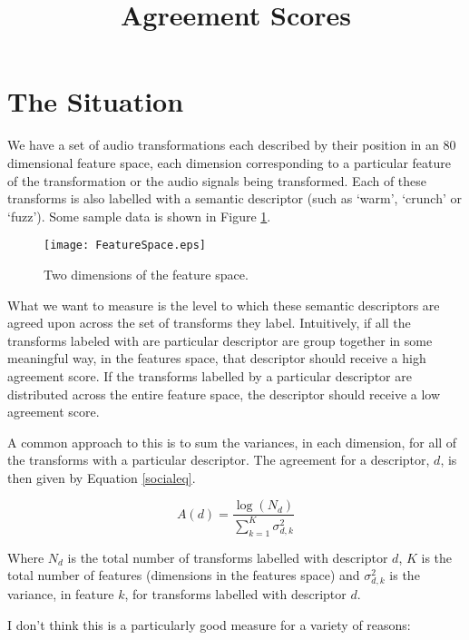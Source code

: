 \documentclass[a4paper]{article}
\title{Agreement Scores}
\author{}
\date{}
\begin{document}
\maketitle

\section*{The Situation}
We have a set of audio transformations each described by their position in an 80 dimensional feature space, each dimension
corresponding to a particular feature of the transformation or the audio signals being transformed. Each of these transforms
is also labelled with a semantic descriptor (such as `warm', `crunch' or `fuzz'). Some sample data is shown in Figure
\ref{FeatureSpace}.

	\begin{figure}
		\centering
		\texttt{[image: FeatureSpace.eps]}
		\caption{Two dimensions of the feature space.}
		\label{FeatureSpace}
	\end{figure}

What we want to measure is the level to which these semantic descriptors are agreed upon across the set of transforms they
label. Intuitively, if all the transforms labeled with are particular descriptor are group together in some meaningful way,
in the features space, that descriptor should receive a high agreement score. If the transforms labelled by a particular
descriptor are distributed across the entire feature space, the descriptor should receive a low agreement score.

A common approach to this is to sum the variances, in each dimension, for all of the transforms with a particular
descriptor.  The agreement for a descriptor, $d$, is then given by Equation \ref{socialeq}.

	\begin{equation}
		A(d) = \frac{\log(N_{d})}{\sum_{k=1}^{K} \sigma_{d,k}^{2}}
		\label{socialeq}
	\end{equation}

Where $N_{d}$ is the total number of transforms labelled with descriptor $d$, $K$ is the total number of features
(dimensions in the features space) and $\sigma_{d,k}^{2}$ is the variance, in feature $k$, for transforms labelled with
descriptor $d$.

I don't think this is a particularly good measure for a variety of reasons:
\end{document}
